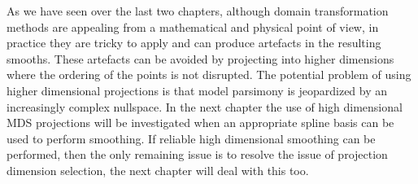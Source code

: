 As we have seen over the last two chapters, although domain transformation methods are appealing from a mathematical and physical point of view, in practice they are tricky to apply and can produce artefacts in the resulting smooths. These artefacts can be avoided by projecting into higher dimensions where the ordering of the points is not disrupted. The potential problem of using higher dimensional projections is that model parsimony is jeopardized by an increasingly complex nullspace. In the next chapter the use of high dimensional MDS projections will be investigated when an appropriate spline basis can be used to perform smoothing. If reliable high dimensional smoothing can be performed, then the only remaining issue is to resolve the issue of projection dimension selection, the next chapter will deal with this too.
